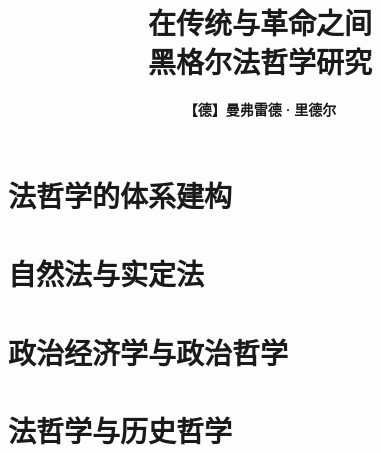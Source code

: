 \documentclass[a4paper, 12pt, openright]{ctexbook}
\title{\Huge \textbf{在传统与革命之间}\\\Large 黑格尔法哲学研究}
\author{\textbf{【德】曼弗雷德·里德尔}}
\date{}
\begin{document}
\frontmatter

\maketitle



\tableofcontents

\mainmatter




\part{法哲学的体系建构}



\part{自然法与实定法}



\part{政治经济学与政治哲学}



\part{法哲学与历史哲学}





\end{document}
